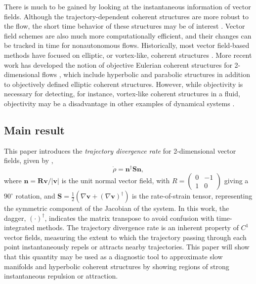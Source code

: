 \documentclass[twocolumn]{svjour3}
\newcommand{\edit}[3]{{\color{red} #2}}
\begin{document}
There is much to be gained by looking at the instantaneous information of vector fields. Although the trajectory-dependent coherent structures are more robust to the flow, the short time behavior of these structures may be of interest \cite{haller2010localized}. Vector field schemes are also much more computationally efficient, and their changes can be tracked in time for nonautonomous flows. Historically, most vector field-based methods have focused on elliptic, or vortex-like, coherent structures \cite{chakraborty2005relationships}. More recent work has developed the notion of objective Eulerian coherent structures for 2-dimensional flows \cite{serra_objective_2016}, which include hyperbolic and parabolic structures in addition to objectively defined elliptic coherent structures. However, while objectivity is necessary for detecting, for instance, vortex-like coherent structures in a fluid, objectivity may be a disadvantage in other examples of dynamical systems \cite{haller_variational_2011,lopesino2017theoretical}.


\subsection{Main result}
This paper introduces the \textit{trajectory divergence rate} for 2-dimensional vector fields, given by \edit{Eq. (\ref{eq:DivRate})}{}{4},
\begin{equation*}
\dot{\rho} = \mathbf{n}^\dagger\mathbf{S}\mathbf{n},
\end{equation*}
where $\mathbf{n} = \mathbf{R}\mathbf{v}/\left|\mathbf{v}\right|$ is the unit normal vector field, \edit{}{with $R=\left(\begin{smallmatrix}
0 & -1 \\ 1 & 0
\end{smallmatrix}\right)$ giving a $90^\circ$ rotation,}{4} and $\mathbf{S}=\tfrac{1}{2}\left(\nabla\mathbf{v}+(\nabla\mathbf{v})^\dagger\right)$ is the rate-of-strain tensor, representing the symmetric component of the Jacobian of the system. In this work, the dagger, \((\cdot)^\dagger\), indicates the matrix transpose to avoid confusion with time-integrated methods. The trajectory divergence rate is an inherent property of $C^1$ vector fields, measuring the extent to which the trajectory passing through each point instantaneously repels or attracts nearby trajectories. This paper will show that this quantity may be used as a diagnostic tool to approximate slow manifolds and hyperbolic coherent structures by showing regions of strong instantaneous repulsion or attraction.
\end{document}
